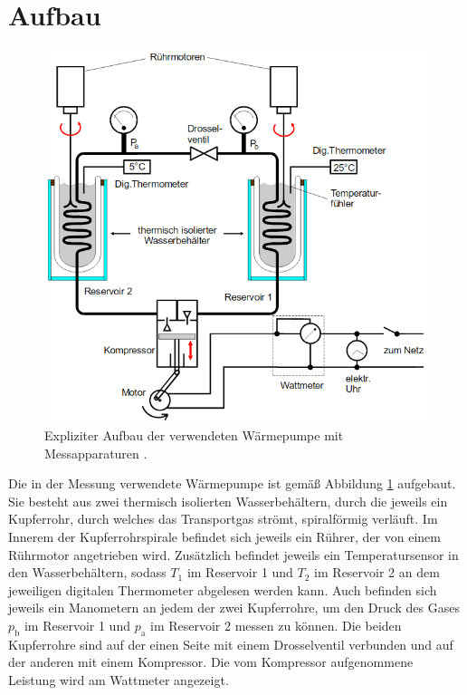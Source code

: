 \section{Aufbau}
\label{sec:Aufbau}
\begin{figure}
	\centering
	\includegraphics[width=\linewidth-100pt,height=\textheight-100pt,keepaspectratio]{content/Bilder/Aufbau2.png}
	\caption{Expliziter Aufbau der verwendeten Wärmepumpe mit Messapparaturen \cite{V206}.}
	\label{fig:Aufbau2}
\end{figure}
Die in der Messung verwendete Wärmepumpe ist gemäß Abbildung \ref{fig:Aufbau2} aufgebaut. Sie besteht aus zwei thermisch isolierten Wasserbehältern, durch die jeweils ein Kupferrohr, durch welches das Transportgas strömt, spiralförmig verläuft. Im Innerem der Kupferrohrspirale befindet sich jeweils ein Rührer, der von einem Rührmotor angetrieben wird. Zusätzlich befindet jeweils ein Temperatursensor in den Wasserbehältern, sodass $T_1$ im Reservoir 1 und $T_2$ im Reservoir 2 an dem jeweiligen digitalen Thermometer abgelesen werden kann. Auch befinden sich jeweils ein Manometern an jedem der zwei Kupferrohre, um den Druck des Gases $p_\text{b}$ im Reservoir 1 und $p_\text{a}$ im Reservoir 2 messen zu können. Die beiden Kupferrohre sind auf der einen Seite mit einem Drosselventil verbunden und auf der anderen mit einem Kompressor. Die vom Kompressor aufgenommene Leistung wird am Wattmeter angezeigt.
